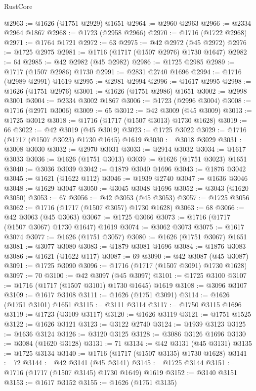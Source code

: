 \begin{lexlean}{RustCore}
\begin{coremodule}
@2963 := @1626 (@1751 @2929) @1651
@2964 := @2960 @2963
@2966 := @2334 @2964 @1867
@2968 := @1723 (@2958 @2966)
@2970 := @1716 (@1722 @2968)
@2971 := @1764 @1721
@2972 := 63
@2975 := @42 @2972 (@45 @2972)
@2976 := @1725 @2975
@2981 := @1716 (@1717 (@1507 @2976) @1730 @1647)
@2982 := 64
@2985 := @42 @2982 (@45 @2982)
@2986 := @1725 @2985
@2989 := @1717 (@1507 @2986) @1730
@2991 := @2831 @2740 @1696
@2994 := @1716 (@2989 @2991) @1619
@2995 := @2981 @2994
@2996 := @1617 @2995
@2998 := @1626 (@1751 @2976)
@3001 := @1626 (@1751 @2986) @1651
@3002 := @2998 @3001
@3004 := @2334 @3002 @1867
@3006 := @1723 (@2996 @3004)
@3008 := @1716 (@2971 @3006)
@3009 := 65
@3012 := @42 @3009 (@45 @3009)
@3013 := @1725 @3012
@3018 := @1716 (@1717 (@1507 @3013) @1730 @1628)
@3019 := 66
@3022 := @42 @3019 (@45 @3019)
@3023 := @1725 @3022
@3029 := @1716 (@1717 (@1507 @3023) @1730 @1645) @1619
@3030 := @3018 @3029
@3031 := @3008 @3030
@3032 := @2970 @3031
@3033 := @2914 @3032
@3034 := @1617 @3033
@3036 := @1626 (@1751 @3013)
@3039 := @1626 (@1751 @3023) @1651
@3040 := @3036 @3039
@3042 := @1879 @3040 @1696
@3043 := @1876 @3042
@3045 := @1621 (@1622 @112)
@3046 := @1939 @2740
@3047 := @1636 @3046
@3048 := @1629 @3047
@3050 := @3045 @3048 @1696
@3052 := @3043 (@1620 @3050)
@3053 := 67
@3056 := @42 @3053 (@45 @3053)
@3057 := @1725 @3056
@3062 := @1716 (@1717 (@1507 @3057) @1730 @1628)
@3063 := 68
@3066 := @42 @3063 (@45 @3063)
@3067 := @1725 @3066
@3073 := @1716 (@1717 (@1507 @3067) @1730 @1647) @1619
@3074 := @3062 @3073
@3075 := @1617 @3074
@3077 := @1626 (@1751 @3057)
@3080 := @1626 (@1751 @3067) @1651
@3081 := @3077 @3080
@3083 := @1879 @3081 @1696
@3084 := @1876 @3083
@3086 := @1621 (@1622 @117)
@3087 := 69
@3090 := @42 @3087 (@45 @3087)
@3091 := @1725 @3090
@3096 := @1716 (@1717 (@1507 @3091) @1730 @1628)
@3097 := 70
@3100 := @42 @3097 (@45 @3097)
@3101 := @1725 @3100
@3107 := @1716 (@1717 (@1507 @3101) @1730 @1645) @1619
@3108 := @3096 @3107
@3109 := @1617 @3108
@3111 := @1626 (@1751 @3091)
@3114 := @1626 (@1751 @3101) @1651
@3115 := @3111 @3114
@3117 := @1750 @3115 @1696
@3119 := @1723 (@3109 @3117)
@3120 := @1626 @3119
@3121 := @1751 @1525
@3122 := @1626 @3121
@3123 := @3122 @2740
@3124 := @1939 @3123
@3125 := @1636 @3124
@3126 := @3120 @3125
@3128 := @3086 @3126 @1696
@3130 := @3084 (@1620 @3128)
@3131 := 71
@3134 := @42 @3131 (@45 @3131)
@3135 := @1725 @3134
@3140 := @1716 (@1717 (@1507 @3135) @1730 @1628)
@3141 := 72
@3144 := @42 @3141 (@45 @3141)
@3145 := @1725 @3144
@3151 := @1716 (@1717 (@1507 @3145) @1730 @1649) @1619
@3152 := @3140 @3151
@3153 := @1617 @3152
@3155 := @1626 (@1751 @3135)

\end{coremodule}
\end{lexlean}
